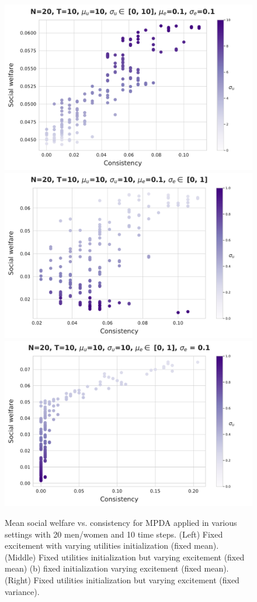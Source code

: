 \begin{figure}
    \centering
    \includegraphics[width=0.32\linewidth]{figures/mpda_dynamics_initliazation.pdf}
    \includegraphics[width=0.32\linewidth]{figures/mpda_dynamics_excitement_std.pdf}
    \includegraphics[width=0.32\linewidth]{figures/mpda_dynamics_excitement_mean.pdf}
     \caption{Mean social welfare vs. consistency for MPDA applied in various settings with 20 men/women and 10 time steps. (Left) Fixed excitement with varying utilities initialization (fixed mean). (Middle) Fixed utilities initialization but varying excitement (fixed mean) (b) fixed initialization varying excitement (fixed mean). (Right) Fixed utilities initialization but varying excitement (fixed variance).}
    \label{fig:mpda_dynamics}
\end{figure}
